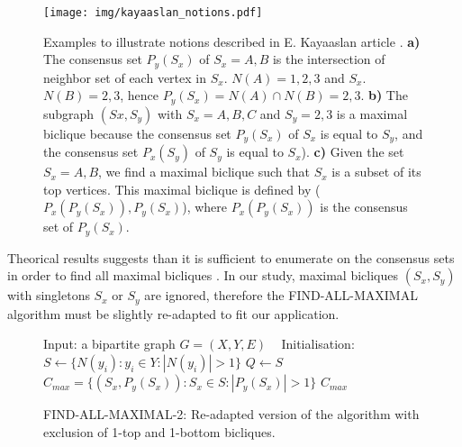 \documentclass[table]{report}
\begin{document}
\begin{figure}[h]%
\centering
\texttt{[image: img/kayaaslan\_notions.pdf]}
\caption{Examples to illustrate notions described in E. Kayaaslan article \cite{kayaaslan}. 
\textbf{a)} The consensus set $P_y(S_x)$ of $S_x = {A,B}$ is the intersection of neighbor set of each vertex in $S_x$. $N(A) = {1,2,3}$ and $S_x$. $N(B) = {2,3}$, hence $P_y(S_x) = N(A) \cap N(B) = {2,3}$. 
\textbf{b)} The subgraph $(Sx, S_y)$ with $S_x = {A,B,C}$ and $S_y = {2,3}$ is a maximal biclique because the consensus set $P_y(S_x)$ of $S_x$ is equal to $S_y$, and the consensus set $P_x(S_y)$ of $S_y$ is equal to $S_x$).
\textbf{c)} Given the set $S_x = {A,B}$, we find a maximal biclique such that $S_x$ is a subset of its top vertices. This maximal biclique is defined by ($P_x(P_y(S_x)),P_y(S_x)$), where $P_x(P_y(S_x))$ is the consensus set of $P_y(S_x)$. }


\label{fig:kayaaslan_notions}
\end{figure}
\FloatBarrier

Theorical results suggests than it is sufficient to enumerate on the consensus sets in order to find all maximal bicliques \cite{kayaaslan}. In our study, maximal bicliques ${(S_x, S_y)}$ with singletons $S_x$ or $S_y$ are ignored, therefore the FIND-ALL-MAXIMAL algorithm must be slightly re-adapted to fit our application.  

\begin{figure}[htb]
\centering
\begin{minipage}{.7\columnwidth}
\begin{algorithm}[H]
\SetAlgoLined
 Input: a bipartite graph $G = (X,Y,E)$ \
 \BlankLine
 Initialisation: \;
 $S \leftarrow \{N(y_i): y_i \in Y : |N(y_i)| > 1\}$  \; 
 $Q \leftarrow S$\;
 \BlankLine
 \BlankLine
 $C_{max} = \{(S_x,P_y(S_x)):S_x \in S : |P_y(S_x)| > 1\}$ \;
 \Return $C_{max}$
  \BlankLine
\caption{FIND-ALL-MAXIMAL-2: Re-adapted version of the  algorithm with exclusion of 1-top and 1-bottom bicliques.}
\end{algorithm}
\end{minipage}
\end{figure}
\FloatBarrier
\end{document}
